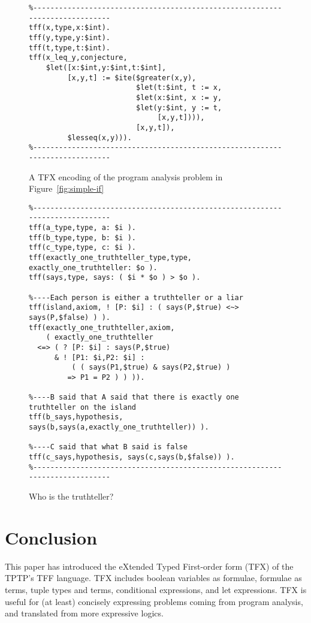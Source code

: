 \documentclass{easychair}
\begin{document}
\begin{figure}[htbp]
\begin{verbatim}
%-----------------------------------------------------------------------------
tff(x,type,x:$int).
tff(y,type,y:$int).
tff(t,type,t:$int).
tff(x_leq_y,conjecture,
    $let([x:$int,y:$int,t:$int],
         [x,y,t] := $ite($greater(x,y),
                         $let(t:$int, t := x,
                         $let(x:$int, x := y,
                         $let(y:$int, y := t,
                              [x,y,t]))),
                         [x,y,t]),
         $lesseq(x,y))).
%-----------------------------------------------------------------------------
\end{verbatim}
\caption{A TFX encoding of the program analysis problem in
Figure~\ref{fig:simple-if}}
\label{LetITE}
\end{figure}

\begin{figure}[htbp]
\begin{verbatim}
%-----------------------------------------------------------------------------
tff(a_type,type, a: $i ).
tff(b_type,type, b: $i ).
tff(c_type,type, c: $i ).
tff(exactly_one_truthteller_type,type, exactly_one_truthteller: $o ).
tff(says,type, says: ( $i * $o ) > $o ).

%----Each person is either a truthteller or a liar
tff(island,axiom, ! [P: $i] : ( says(P,$true) <~> says(P,$false) ) ).
tff(exactly_one_truthteller,axiom,
    ( exactly_one_truthteller
  <=> ( ? [P: $i] : says(P,$true)
      & ! [P1: $i,P2: $i] :
          ( ( says(P1,$true) & says(P2,$true) )
         => P1 = P2 ) ) )).

%----B said that A said that there is exactly one truthteller on the island
tff(b_says,hypothesis, says(b,says(a,exactly_one_truthteller)) ).

%----C said that what B said is false
tff(c_says,hypothesis, says(c,says(b,$false)) ).
%-----------------------------------------------------------------------------
\end{verbatim}
\caption{Who is the truthteller?}
\label{Truthteller}
\end{figure}

\section{Conclusion}
\label{Conclusion}

This paper has introduced the eXtended Typed First-order form (TFX) of the
TPTP's TFF language.
TFX includes boolean variables as formulae, formulae as terms, tuple types and
terms, conditional expressions, and let expressions.
TFX is useful for (at least) concisely expressing problems coming from 
program analysis, and translated from more expressive logics.
\end{document}
